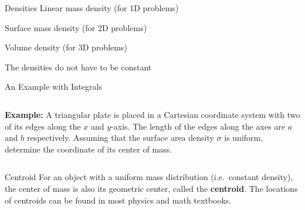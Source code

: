 \documentclass[12pt,compress,aspectratio=169]{beamer}
\begin{document}
\begin{frame}{Densities}
  Linear mass density (for 1D problems)


  Surface mass density (for 2D problems)


  Volume density (for 3D problems)

  
  The densities do not have to be constant
\end{frame}



\begin{frame}{An Example with Integrals}
  \begin{columns}
    \textbf{Example:} A triangular plate is placed in a Cartesian coordinate
    system with two of its edges along the $x$ and $y$-axis. The length of the
    edges along the axes are $a$ and $b$ respectively. Assuming that the
    surface area density $\sigma$ is uniform, determine the coordinate of its
    center of mass.

  \end{columns}
\end{frame}



\begin{frame}{Centroid}
  For an object with a uniform mass distribution (i.e.\ constant density), the
  center of mass is also its geometric center, called the \textbf{centroid}.
  The locations of centroids can be found in most physics and math textbooks.
  \begin{center}
  \end{center}
\end{frame}
\end{document}
